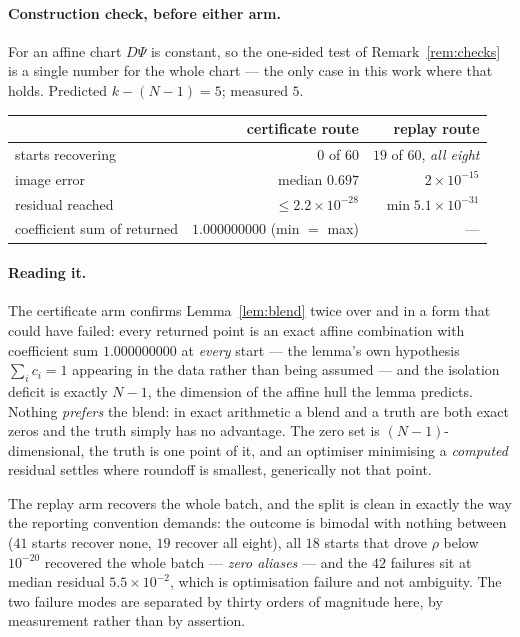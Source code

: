 \paragraph{Construction check, before either arm.} For an affine chart $D\Psi$
is constant, so the one-sided test of Remark~\ref{rem:checks} is a single number
for the whole chart --- the only case in this work where that holds. Predicted
$k-(N-1)=5$; measured $5$.

\begin{center}
\begin{tabular}{lrr}
\toprule
 & certificate route & replay route \\
\midrule
starts recovering            & $0$ of $60$      & $19$ of $60$, \emph{all eight} \\
image error                  & median $0.697$   & $2\times10^{-15}$ \\
residual reached             & $\le2.2\times10^{-28}$ & $\min 5.1\times10^{-31}$ \\
coefficient sum of returned  & $1.000000000$ (min $=$ max) & --- \\
\bottomrule
\end{tabular}
\end{center}

\paragraph{Reading it.} The certificate arm confirms Lemma~\ref{lem:blend} twice
over and in a form that could have failed: every returned point is an exact
affine combination with coefficient sum $1.000000000$ at \emph{every} start ---
the lemma's own hypothesis $\sum_ic_i=1$ appearing in the data rather than being
assumed --- and the isolation deficit is exactly $N-1$, the dimension of the
affine hull the lemma predicts. Nothing \emph{prefers} the blend: in exact
arithmetic a blend and a truth are both exact zeros and the truth simply has no
advantage. The zero set is $(N-1)$-dimensional, the truth is one point of it,
and an optimiser minimising a \emph{computed} residual settles where roundoff is
smallest, generically not that point.

The replay arm recovers the whole batch, and the split is clean in exactly the
way the reporting convention demands: the outcome is bimodal with nothing
between ($41$ starts recover none, $19$ recover all eight), all $18$ starts that
drove $\rho$ below $10^{-20}$ recovered the whole batch --- \emph{zero aliases}
--- and the $42$ failures sit at median residual $5.5\times10^{-2}$, which is
optimisation failure and not ambiguity. The two failure modes are separated by
thirty orders of magnitude here, by measurement rather than by assertion.


